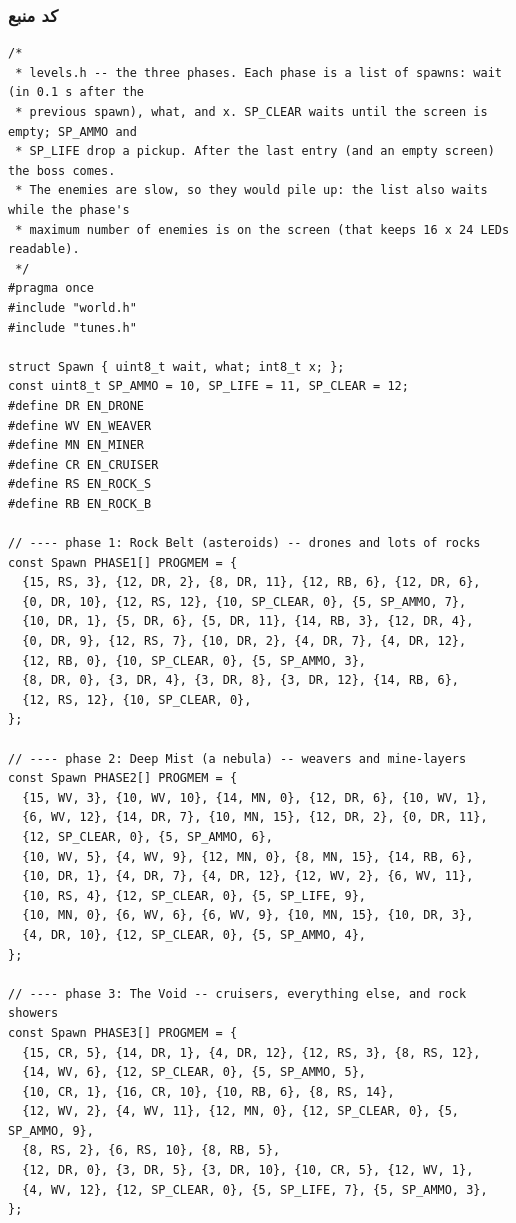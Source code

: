 \documentclass[11pt,a4paper]{article}
\begin{document}
\subsubsection*{کد منبع}
\begin{latin}
\begin{lstlisting}[language=Arduino]
/*
 * levels.h -- the three phases. Each phase is a list of spawns: wait (in 0.1 s after the
 * previous spawn), what, and x. SP_CLEAR waits until the screen is empty; SP_AMMO and
 * SP_LIFE drop a pickup. After the last entry (and an empty screen) the boss comes.
 * The enemies are slow, so they would pile up: the list also waits while the phase's
 * maximum number of enemies is on the screen (that keeps 16 x 24 LEDs readable).
 */
#pragma once
#include "world.h"
#include "tunes.h"

struct Spawn { uint8_t wait, what; int8_t x; };
const uint8_t SP_AMMO = 10, SP_LIFE = 11, SP_CLEAR = 12;
#define DR EN_DRONE
#define WV EN_WEAVER
#define MN EN_MINER
#define CR EN_CRUISER
#define RS EN_ROCK_S
#define RB EN_ROCK_B

// ---- phase 1: Rock Belt (asteroids) -- drones and lots of rocks
const Spawn PHASE1[] PROGMEM = {
  {15, RS, 3}, {12, DR, 2}, {8, DR, 11}, {12, RB, 6}, {12, DR, 6},
  {0, DR, 10}, {12, RS, 12}, {10, SP_CLEAR, 0}, {5, SP_AMMO, 7},
  {10, DR, 1}, {5, DR, 6}, {5, DR, 11}, {14, RB, 3}, {12, DR, 4},
  {0, DR, 9}, {12, RS, 7}, {10, DR, 2}, {4, DR, 7}, {4, DR, 12},
  {12, RB, 0}, {10, SP_CLEAR, 0}, {5, SP_AMMO, 3},
  {8, DR, 0}, {3, DR, 4}, {3, DR, 8}, {3, DR, 12}, {14, RB, 6},
  {12, RS, 12}, {10, SP_CLEAR, 0},
};

// ---- phase 2: Deep Mist (a nebula) -- weavers and mine-layers
const Spawn PHASE2[] PROGMEM = {
  {15, WV, 3}, {10, WV, 10}, {14, MN, 0}, {12, DR, 6}, {10, WV, 1},
  {6, WV, 12}, {14, DR, 7}, {10, MN, 15}, {12, DR, 2}, {0, DR, 11},
  {12, SP_CLEAR, 0}, {5, SP_AMMO, 6},
  {10, WV, 5}, {4, WV, 9}, {12, MN, 0}, {8, MN, 15}, {14, RB, 6},
  {10, DR, 1}, {4, DR, 7}, {4, DR, 12}, {12, WV, 2}, {6, WV, 11},
  {10, RS, 4}, {12, SP_CLEAR, 0}, {5, SP_LIFE, 9},
  {10, MN, 0}, {6, WV, 6}, {6, WV, 9}, {10, MN, 15}, {10, DR, 3},
  {4, DR, 10}, {12, SP_CLEAR, 0}, {5, SP_AMMO, 4},
};

// ---- phase 3: The Void -- cruisers, everything else, and rock showers
const Spawn PHASE3[] PROGMEM = {
  {15, CR, 5}, {14, DR, 1}, {4, DR, 12}, {12, RS, 3}, {8, RS, 12},
  {14, WV, 6}, {12, SP_CLEAR, 0}, {5, SP_AMMO, 5},
  {10, CR, 1}, {16, CR, 10}, {10, RB, 6}, {8, RS, 14},
  {12, WV, 2}, {4, WV, 11}, {12, MN, 0}, {12, SP_CLEAR, 0}, {5, SP_AMMO, 9},
  {8, RS, 2}, {6, RS, 10}, {8, RB, 5},
  {12, DR, 0}, {3, DR, 5}, {3, DR, 10}, {10, CR, 5}, {12, WV, 1},
  {4, WV, 12}, {12, SP_CLEAR, 0}, {5, SP_LIFE, 7}, {5, SP_AMMO, 3},
};


\end{lstlisting}
\end{latin}
\end{document}
